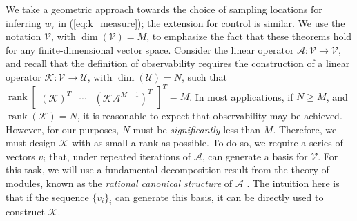 \documentclass[letterpaper,12pt,peerreviewca,draftcls]{IEEEtran}
\newcommand{\weight}{w}
\newcommand{\sysop}{\mathcal{A}}
\newcommand{\measop}{\mathcal{K}}
\newcommand{\nsamp}{N}
\newcommand{\ncent}{M}
\renewcommand{\eqref}[1]{(\ref{eq:#1})}
\DeclareMathOperator{\Rank}{rank}
\newcommand{\linvec}{v}
\newcommand{\linspace}{\mathcal{V}}
\newcommand{\linspaceout}{\mathcal{U}}
\newcommand{\tindex}{\tau}
\DeclareMathOperator{\dims}{dim}
\begin{document}
We take a geometric approach towards the choice of sampling locations for inferring $\weight_{\tindex}$ in  \eqref{k_measure}; the extension for control is similar.  We use the notation $\linspace$, with $\dims(\linspace)=\ncent$, to emphasize the fact that these theorems hold for any finite-dimensional vector space. Consider the linear operator $\sysop:\linspace\rightarrow\linspace$, and recall that the definition of observability requires the construction of a linear operator $\measop:\linspace\to\linspaceout$, with $\dim(\linspaceout) = \nsamp$, such that 
$\Rank\left[
 \begin{smallmatrix}
  \left(\measop\right)^T &
  \cdots &
  \left(\measop \sysop^{\ncent-1}\right)^T
 \end{smallmatrix}
 \right]^T = \ncent$. 
In most applications, if $\nsamp\geq\ncent$, and $\Rank\left(\measop\right) = \nsamp$, it is reasonable to expect that observability may be achieved. However, for our purposes, $\nsamp$ must be \emph{significantly} less than $\ncent$. Therefore, we must design $\measop$ with as small a rank as possible. To do so, we require a series of vectors $\linvec_i$ that, under repeated iterations of $\sysop$, can generate a basis for $\linspace$. For this task, we will use a fundamental decomposition result from the theory of modules, known as the \emph{rational canonical structure} of $\sysop$ \cite{wonham1974linear}. The intuition here is that if the sequence $\{\linvec_i\}_{i}$ can generate this basis, it can be directly used to construct $\measop$.
\end{document}
